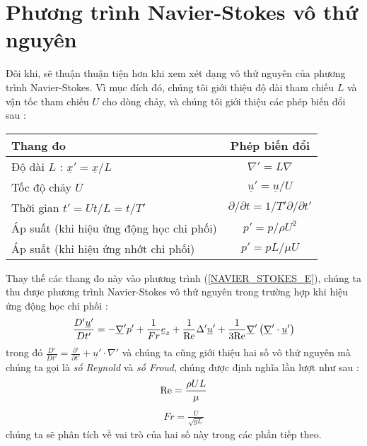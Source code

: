\documentclass[CO_LUU_CHAT_NANG_CAO.tex]{subfiles}
\begin{document}
\section{Phương trình Navier-Stokes vô thứ nguyên}
Đôi khi, sẽ thuận thuận tiện hơn khi xem xét dạng vô thứ nguyên của phương trình Navier-Stokes. Vì mục đích đó, chúng tôi giới thiệu độ dài tham chiếu $L$ và vận tốc tham chiếu $U$ cho dòng chảy, và chúng tôi giới thiệu các phép biến đổi sau :
\begin{center}
    \begin{tabular}{|l|c|}
        \hline
        \textbf{Thang đo} & \textbf{Phép biến đổi}\\
        \hline
        Độ dài $L$ : $\displaystyle\underline{x}' = \underline{x}/L$ &$\displaystyle\nabla ' = L\nabla$\\
        \hline
        Tốc độ chảy $U$ & $\displaystyle\underline{u}' = \underline{u}/{U}$ \\
        \hline
        Thời gian $\displaystyle t'={Ut}/{L}={t}/{T'}$ & $\displaystyle{\partial }/{{\partial t}} = {{{1/T'}}}{\partial }/{{\partial t'}}$ \\
        \hline
        Áp suất (khi hiệu ứng động học chi phối) & $\displaystyle{p'} = {p}/{{\rho {U^2}}}$ \\
        \hline
        Áp suất (khi hiệu ứng nhớt chi phối) & $\displaystyle{p'} = {pL}/{{\mu {U}}}$ \\
        \hline
    \end{tabular}
\end{center}

Thay thế các thang đo này vào phương trình (\ref{NAVIER_STOKES_E}), chúng ta thu được phương trình Navier-Stokes vô thứ nguyên trong trường hợp khi hiệu ứng động học chi phối :
\begin{equation}\label{NAVIER_STOKES_ER}
    \begin{aligned}
        \frac{{D'\underline u '}}{{Dt'}} =  - \underline{\nabla}'p' + \frac{1}{{Fr}}{\underline e _z} + \frac{1}{{{\mathop{\rm Re}\nolimits} }}\Delta '\underline u ' + \frac{1}{{3{\mathop{\rm Re}\nolimits} }}\underline{\nabla} '\left( {\underline{\nabla}'\cdot\underline u '} \right)
    \end{aligned}
\end{equation}
trong đó $\displaystyle\frac{{D'}}{{Dt'}} = \frac{{\partial '}}{{\partial t'}} + \underline u ' \cdot \nabla '$ và chúng ta cũng giới thiệu hai số vô thứ nguyên mà chúng ta gọi là \emph{số Reynold} và \emph{số Froud}, chúng được định nghĩa lần lượt như sau :
\begin{equation}\label{REYNOLD_DEF}
    \begin{aligned}
        {\mathop{\rm Re}\nolimits}  = \frac{{\rho UL}}{\mu }
    \end{aligned}
\end{equation}
\begin{equation}\label{FROUD_DEF}
    \begin{aligned}
        Fr = \frac{U}{{\sqrt {gL} }}
    \end{aligned}
\end{equation}
chúng ta sẽ phân tích về vai trò của hai số này trong các phần tiếp theo.
\end{document}
